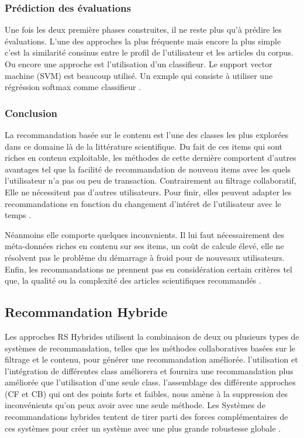         \subsubsection{Prédiction des évaluations}
        \par Une fois les deux première phases construites, il ne reste plus qu'à prédire les évaluations. L'une des approches la plus fréquente mais encore la plus simple c'est la similarité consinus entre le profil de l'utilisateur et les articles du corpus. Ou encore une approche est l'utilisation d'un classifieur. Le support vector machine (SVM) est beaucoup utilisé. Un exmple qui consiste à utiliser une régréssion softmax comme classifieur \cite{ch1ref15}.
        
        \subsubsection{Conclusion}
        \par La recommandation basée sur le contenu est l'une des classes les plus explorées dans ce domaine là de la littérature scientifique. Du fait de ces items qui sont riches en contenu exploitable, les méthodes de cette dernière comportent d'autres avantages tel que la facilité de recommandation de nouveau items avec les quels l'utilisateur n'a pas ou peu de transaction. Contrairement au filtrage collaboratif, Elle ne nécessitent pas d'autres utilisateurs. Pour finir, elles peuvent adapter les recommandations en fonction du changement d'intéret de l'utilisateur avec le temps \cite{ch1ref15}.
        
        \par Néanmoins elle comporte quelques inconvnients. Il lui faut nécessairement des méta-données riches en contenu sur ses items, un coût de calcule élevé, elle ne résolvent pas le problème du démarrage à froid pour de nouveaux utilisateurs. Enfin, les recommandations ne prennent pas en considération certain critères tel que,  la qualité ou la complexité des articles scientifiques recommandés \cite{ch1ref15}.
        
	\subsection{Recommandation Hybride}
	\par Les approches RS Hybrides utilisent la combinaison de deux ou plusieurs types de systèmes de recommandation, telles que les méthodes collaboratives basées sur le filtrage et le contenu, pour générer une recommandation améliorée. l'utilisation et l'intégration de différentes class améliorera et fournira une recommandation plus améliorée que l'utilisation d'une seule class. l'assemblage des différente approches (CF et CB) qui ont des points forts et faibles, nous amène à la suppression des inconvénients qu'on peux avoir avec une seule méthode. Les Systèmes de recommandations hybrides tentent de tirer parti des forces complémentaires de ces systèmes pour créer un système avec une plus grande robustesse globale \cite{ch1ref7,ch1ref6}.
	
